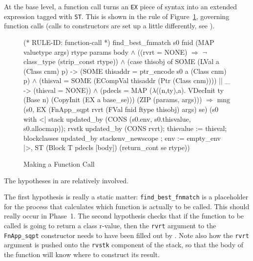 \documentclass[11pt]{article}
\begin{document}
%
%
%
At the base level, a function call turns an \texttt{EX} piece of
syntax into an extended expression tagged with \texttt{ST}.  This is
shown in the rule  of
Figure~\ref{fig:function-call}, governing function calls (calls to
constructors are set up a little differently, see
).
\begin{figure}[hbtp]
\begin{stdrule}
(* RULE-ID: function-call *)
     find_best_fnmatch s0 fnid (MAP valuetype args) rtype params body \(\land\)
     ((rvrt = NONE) \(\Rightarrow\) \(\neg\)class_type (strip_const rtype)) \(\land\)
     (case thisobj of
         SOME (LVal a (Class cnm) p) ->
            (SOME thisaddr = ptr_encode s0 a (Class cnm) p) \(\land\)
            (thisval = SOME (ECompVal thisaddr (Ptr (Class cnm))))
      || _ -> (thisval = NONE)) \(\land\)
     (pdecls = MAP (\(\lambda\)((n,ty),a). VDecInit ty
                                          (Base n)
                                          (CopyInit (EX a base_se)))
                   (ZIP (params, args)))
   \(\Rightarrow\)
     mng (s0, EX (FnApp_sqpt rvrt (FVal fnid ftype thisobj) args) se)
         (s0 with <| stack updated_by
                        (CONS (s0.env, s0.thisvalue, s0.allocmap));
                     rvstk updated_by (CONS rvrt);
                     thisvalue := thisval;
                     blockclasses updated_by stackenv_newscope ;
                     env := empty_env |>,
          ST (Block T pdecls [body]) (return_cont se rtype))
\end{stdrule}
\caption{Making a Function Call}
\label{fig:function-call}
\end{figure}
%
%
The hypotheses in  are relatively involved.

The first hypothesis is really a static matter:
\texttt{find_best_fnmatch} is a placeholder for the process that
calculates which function is actually to be called.  This should
really occur in Phase~1.  The second hypothesis checks that if the
function to be called is going to return a class r-value, then the
\texttt{rvrt} argument to the \texttt{FnApp_sqpt} constructor needs to
have been filled out by .  Note also how the
\texttt{rvrt} argument is pushed onto the \texttt{rvstk} component of
the stack, so that the body of the function will know where to
construct its result.
\end{document}
